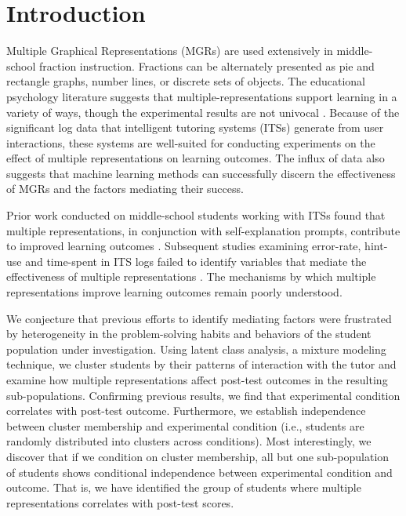 \documentclass{edm_template}
\begin{document}

\section{Introduction}

Multiple Graphical Representations (MGRs) are used extensively in middle-school fraction instruction.  Fractions can be alternately presented as pie and rectangle graphs, number lines, or discrete sets of objects. The educational psychology literature suggests that multiple-representations support learning in a variety of ways, though the experimental results are not univocal \cite{Ainsworth1999}. Because of the significant log data that intelligent tutoring systems (ITSs) generate from user interactions, these systems are well-suited for conducting experiments on the effect of multiple representations on learning outcomes. The influx of data also suggests that machine learning methods can successfully discern the effectiveness of MGRs and the factors mediating their success.

Prior work conducted on middle-school students working with ITSs found that multiple representations, in conjunction with self-explanation prompts, contribute to improved learning outcomes \cite{Rau2009}. Subsequent studies examining error-rate, hint-use and time-spent in ITS logs failed to identify variables that mediate the effectiveness of multiple representations \cite{Rau2012}. The mechanisms by which multiple representations improve learning outcomes remain poorly understood.

We conjecture that previous efforts to identify mediating factors were frustrated by heterogeneity in the problem-solving habits and behaviors of the student population under investigation. Using latent class analysis, a mixture modeling technique, we cluster students by their patterns of interaction with the tutor and examine how multiple representations affect post-test outcomes in the resulting sub-populations. Confirming previous results, we find that experimental condition correlates with post-test outcome. Furthermore, we establish independence between cluster membership and experimental condition (i.e., students are randomly distributed into clusters across conditions). Most interestingly, we discover that if we condition on cluster membership, all but one sub-population of students shows conditional independence between experimental condition and outcome. That is, we have identified the group of students where multiple representations correlates with post-test scores.
\end{document}
